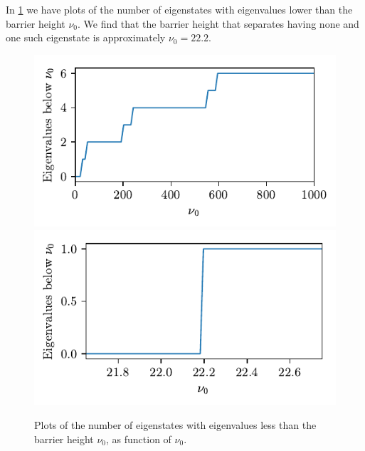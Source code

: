In \cref{fig:eigenvalues_roots} we have plots of the number of eigenstates with eigenvalues lower than the barrier height $\nu_0$. We find that the barrier height that separates having none and one such eigenstate is approximately $\nu_0 = 22.2$.
\begin{figure}[ht!]%
\centering%
\includegraphics{figs/roots_all.pdf}%
\includegraphics{figs/roots_details.pdf}%
\caption{Plots of the number of eigenstates with eigenvalues less than the barrier height $\nu_0$, as function of $\nu_0$. \label{fig:eigenvalues_roots}}%
\end{figure}

